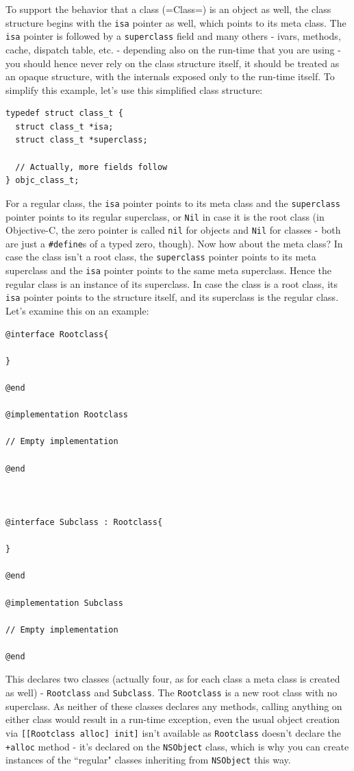To support the behavior that a class (\ver=Class=) is an object as well, the class structure begins with the \verb=isa= pointer as well, which points to its meta class. The \verb=isa= pointer is followed by a \verb=superclass= field and many others - ivars, methods, cache, dispatch table, etc. - depending also on the run-time that you are using - you should hence never rely on the class structure itself, it should be treated as an opaque structure, with the internals exposed only to the run-time itself. To simplify this example, let's use this simplified class structure:

\begin{verbatim}
typedef struct class_t {
  struct class_t *isa;
  struct class_t *superclass;
  
  // Actually, more fields follow
} objc_class_t;
\end{verbatim}

For a regular class, the \verb=isa= pointer points to its meta class and the \verb=superclass= pointer points to its regular superclass, or \verb=Nil= in case it is the root class (in Objective-C, the zero pointer is called \verb=nil= for objects and \verb=Nil= for classes - both are just a \verb=#define=s of a typed zero, though). Now how about the meta class?
In case the class isn't a root class, the \verb=superclass= pointer points to its meta superclass and the \verb=isa= pointer points to the same meta superclass. Hence the regular class is an instance of its superclass. In case the class is a root class, its \verb=isa= pointer points to the structure itself, and its superclass is the regular class. Let's examine this on an example:

\begin{verbatim}@interface Rootclass{
  
}

@end

@implementation Rootclass

// Empty implementation

@end



@interface Subclass : Rootclass{

}

@end

@implementation Subclass

// Empty implementation

@end 
\end{verbatim}

This declares two classes (actually four, as for each class a meta class is created as well) - \verb=Rootclass= and \verb=Subclass=. The \verb=Rootclass= is a new root class with no superclass. As neither of these classes declares any methods, calling anything on either class would result in a run-time exception, even the usual object creation via \verb=[[Rootclass alloc] init]= isn't available as \verb=Rootclass= doesn't declare the \verb=+alloc= method - it's declared on the \verb=NSObject= class, which is why you can create instances of the ``regular" classes inheriting from \verb=NSObject= this way.

